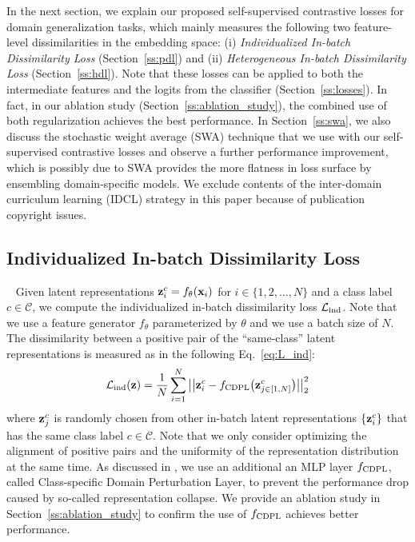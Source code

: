 \documentclass[10pt,twocolumn,letterpaper]{article}
\begin{document}
In the next section, we explain our proposed self-supervised contrastive losses for domain generalization tasks, which mainly measures the following two feature-level dissimilarities in the embedding space: (i) {\em Individualized In-batch Dissimilarity Loss} (Section~\ref{ss:pdl}) and (ii) {\em Heterogeneous In-batch Dissimilarity Loss} (Section~\ref{ss:hdl}). Note that these losses can be applied to both the intermediate features and the logits from the classifier (Section~\ref{ss:losses}). In fact, in our ablation study (Section~\ref{ss:ablation_study}), the combined use of both regularization achieves the best performance. In Section~\ref{ss:swa}, we also discuss the stochastic weight average (SWA) technique that we use with our self-supervised contrastive losses and observe a further performance improvement, which is possibly due to SWA provides the more flatness in loss surface by ensembling domain-specific models. 
We exclude contents of the inter-domain curriculum learning (IDCL) strategy in this paper because of publication copyright issues.

\subsection{Individualized In-batch Dissimilarity Loss}~\label{ss:pdl}
Given latent representations ${\bf{z}}_{i}^{c}=f_{\theta}({\bf{x}}_{i})$ for $i \in \{1, 2, \dots, N\}$ and a class label $c\in\mathcal{C}$, we compute the individualized in-batch dissimilarity loss $\mathcal{L}_\textnormal{ind}$. Note that we use a feature generator $f_{\theta}$ parameterized by $\theta$ and we use a batch size of $N$. The dissimilarity between a positive pair of the ``same-class'' latent representations is measured as in the following Eq.~\ref{eq:L_ind}:
\begin{equation}\label{eq:L_ind}
    \mathcal{L}_\textnormal{ind}({\bf z}) = \frac{1}{N}\sum_{i=1}^{N}\big|\big|{\bf{z}}^{c}_{i}-f_{\textnormal{CDPL}}\big({\bf{z}}^{c}_{j\in[1,N]}\big)\big|\big|^{2}_{2}
\end{equation}
where ${\bf{z}}^{c}_{j}$ is randomly chosen from other in-batch latent representations $\{{\bf{z}}^{c}_{i}\}$ that has the same class label $c\in\mathcal{C}$. Note that we only consider optimizing the alignment of positive pairs and the uniformity of the representation distribution at the same time. As discussed in \cite{grill2020bootstrap}, we use an additional an MLP layer $f_{\textnormal{CDPL}}$, called Class-specific Domain Perturbation Layer, to prevent the performance drop caused by so-called representation collapse. We provide an ablation study in Section~\ref{ss:ablation_study} to confirm the use of $f_{\textnormal{CDPL}}$ achieves better performance.  
\end{document}
